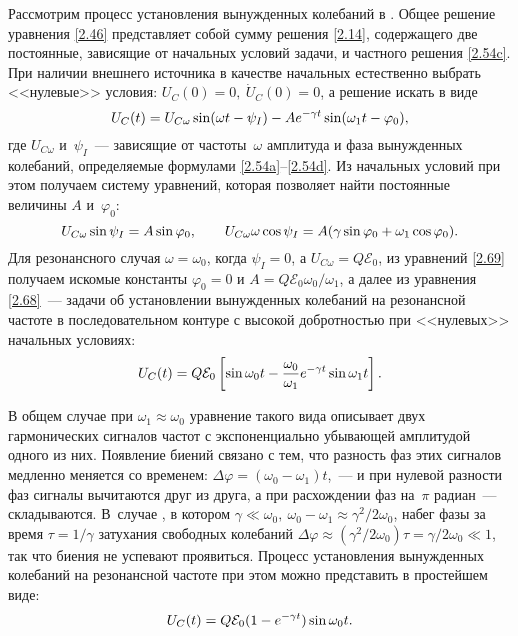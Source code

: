 Рассмотрим процесс установления вынужденных колебаний в
. Общее решение уравнения
\eqref{2.46} представляет собой сумму решения \eqref{2.14}, содержащего две
постоянные, зависящие от начальных условий задачи, и частного решения
\eqref{2.54c}. При наличии внешнего источника в качестве начальных естественно
выбрать <<нулевые>> условия: $U_C(0)=0,~\dot U_C(0)=0$, а решение искать в виде
\begin{equation}
	\eqmark{2.68}
	U_C(t)=U_{C\omega}\sin(\omega t-\psi_I)-A e^{-\gamma
t}\sin(\omega_1t-\varphi_0),
\end{equation}
где $U_{C\omega}$ и~$\psi_I$~--- зависящие от частоты~$\omega$ амплитуда и фаза
вынужденных колебаний, определяемые формулами 
\eqref{2.54a}--\eqref{2.54d}. Из начальных условий
при этом получаем систему уравнений, которая позволяет найти постоянные величины
$A$ и~$\varphi_0$:
\begin{equation*}
	\eqmark{2.69}
	U_{C\omega}\sin\psi_I=A \sin\varphi_0, \qquad
U_{C\omega}\omega\cos\psi_I=A (\gamma\sin\varphi_0+\omega_1\cos\varphi_0).
\end{equation*}
Для резонансного случая $\omega=\omega_0$, когда 
$\psi_I=0$, а $U_{C\omega}=Q\mathcal{E}_0$, из уравнений \eqref{2.69} получаем
искомые константы $\varphi_0=0$ и $A =Q\mathcal{E}_0\omega_0/\omega_1$, а далее
из уравнения \eqref{2.68}~---  задачи об установлении
вынужденных колебаний на резонансной частоте в последовательном контуре с
высокой добротностью при <<нулевых>> начальных условиях:
\begin{equation}
	\eqmark{2.70}
	U_{C}(t)=Q\mathcal{E}_0\left[\sin\omega_0t-\frac{\omega_0}{\omega_1}e^{-\gamma
t}\sin\omega_1 t \right].
\end{equation}

В общем случае при $\omega_1\approx\omega_0$ уравнение такого вида описывает
 двух гармонических сигналов  частот с
экспоненциально убывающей амплитудой одного из них. Появление биений связано с
тем, что разность фаз этих сигналов медленно меняется со временем:
$\Delta\varphi=(\omega_0-\omega_1)t$,~--- и при нулевой разности фаз сигналы
вычитаются друг из друга, а при расхождении фаз на~$\pi$
радиан~--- складываются. В~случае , в котором
$\gamma\ll\omega_0,~\omega_0-\omega_1\approx\gamma^2/2\omega_0$, набег фазы за
время $\tau=1/\gamma$ затухания свободных колебаний
$\Delta\varphi\approx(\gamma^2/2\omega_0)\tau=\gamma/2\omega_0\ll1$,  так что
биения не успевают проявиться. Процесс установления вынужденных колебаний на
резонансной частоте при этом можно представить в простейшем виде:
\begin{equation}\eqmark{2.71}
	U_C(t)=Q\mathcal{E}_0(1-e^{-\gamma t})\sin\omega_0 t.
\end{equation}

